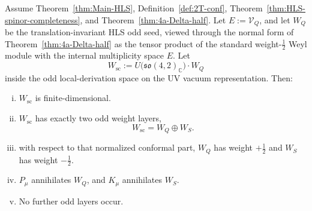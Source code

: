 \begin{theorem}
\label{thm:4b-odd-prolongation}
Assume Theorem~\ref{thm:Main-HLS},
Definition~\ref{def:2T-conf},
Theorem~\ref{thm:HLS-spinor-completeness}, and
Theorem~\ref{thm:4a-Delta-half}. Let \(E:=\mathcal V_Q\), and let \(W_Q\) be the
translation-invariant HLS odd seed, viewed through the normal form of
Theorem~\ref{thm:4a-Delta-half} as the tensor product of the standard
weight-\(\tfrac12\) Weyl module with the internal multiplicity space \(E\). Let
\[
W_{\mathrm{sc}}
:=
U\!\bigl(\mathfrak{so}(4,2)_\mathbb C\bigr)\cdot W_Q
\]
inside the odd local-derivation space on the UV vacuum representation. Then:
\begin{enumerate}[(i)]
  \item \(W_{\mathrm{sc}}\) is finite-dimensional.
  \item \(W_{\mathrm{sc}}\) has exactly two odd weight layers,
\[
W_{\mathrm{sc}} = W_Q \oplus W_S.
\]
  \item with respect to that normalized conformal part, \(W_Q\) has weight
        \(+\tfrac12\) and \(W_S\) has weight \(-\tfrac12\).
  \item \(P_\mu\) annihilates \(W_Q\), and \(K_\mu\) annihilates \(W_S\).
  \item No further odd layers occur.
\end{enumerate}
\end{theorem}

